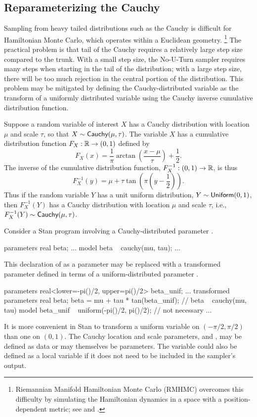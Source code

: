\subsection{Reparameterizing the Cauchy}

Sampling from heavy tailed distributions such as the Cauchy is
difficult for Hamiltonian Monte Carlo, which operates within a
Euclidean geometry.%
%
\footnote{Riemannian Manifold Hamiltonian Monte Carlo (RMHMC) overcomes
  this difficulty by simulating the Hamiltonian dynamics in a space
  with a position-dependent metric; see
  \citep{GirolamiCalderhead:2011} and \citep{Betancourt:2012}.}
%
The practical problem is that tail of the Cauchy
requires a relatively large step size compared to the trunk.  With a
small step size, the No-U-Turn sampler requires many steps when
starting in the tail of the distribution; with a large step size,
there will be too much rejection in the central portion of the
distribution.  This problem may be mitigated by defining the
Cauchy-distributed variable as the transform of a uniformly
distributed variable using the Cauchy inverse cumulative distribution
function.

Suppose a random variable of interest $X$ has a Cauchy distribution
with location $\mu$ and scale $\tau$, so that $X \sim
\distro{Cauchy}(\mu,\tau)$.  The variable $X$ has a cumulative
distribution function $F_X:\reals \rightarrow (0,1)$ defined by
\[
F_X(x) = \frac{1}{\pi} \arctan \left( \frac{x - \mu}{\tau} \right) +
\frac{1}{2}.
\]
The inverse of the cumulative distribution function,
$F_X^{-1}:(0,1) \rightarrow \reals$, is thus
%
\[
F^{-1}_X(y) = \mu + \tau \tan \left( \pi \left( y - \frac{1}{2} \right) \right).
\]
Thus if the random variable $Y$ has a unit uniform distribution, $Y
\sim \distro{Uniform}(0,1)$, then $F^{-1}_X(Y)$ has a Cauchy
distribution with location $\mu$ and scale $\tau$, i.e., $F^{-1}_X(Y) \sim
\distro{Cauchy}(\mu,\tau)$. 

Consider a Stan program involving a Cauchy-distributed parameter
.
%
\begin{stancode}
parameters {
  real beta;
  ...
}
model {
  beta ~ cauchy(mu, tau);
  ...
}
\end{stancode}
%
This declaration of  as a parameter may be replaced with a
transformed parameter  defined in terms of a
uniform-distributed parameter .
%
\begin{stancode}
parameters {
  real<lower=-pi()/2, upper=pi()/2> beta_unif;
  ...
}
transformed parameters {
  real beta;
  beta = mu + tau * tan(beta_unif);  // beta ~ cauchy(mu, tau)
}    
model {
  beta_unif ~ uniform(-pi()/2, pi()/2);  // not necessary
  ...
}
\end{stancode}
%
It is more convenient in Stan to transform a uniform variable on
$(-\pi/2, \pi/2)$ than one on $(0,1)$.  The Cauchy location and scale
parameters,  and , may be defined as data or may
themselves be parameters.  The variable  could also be
defined as a local variable if it does not need to be included in the
sampler's output.

